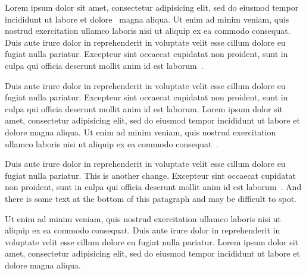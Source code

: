 Lorem ipsum dolor sit amet, consectetur adipisicing elit, sed do eiusmod tempor incididunt ut labore et dolore~\citep{Antoniades:2012qo} magna aliqua. Ut enim ad minim veniam, quis nostrud exercitation ullamco laboris nisi ut aliquip ex ea commodo consequat. Duis aute irure dolor in reprehenderit in voluptate velit esse cillum dolore eu fugiat nulla pariatur. Excepteur sint occaecat cupidatat non proident, sunt in culpa qui officia deserunt mollit anim id est laborum~\citep{International-Parkinsons-Disease-Genomics-Consortium-IPDGC:2011xr}.

Duis aute irure dolor in reprehenderit in voluptate velit esse cillum dolore eu fugiat nulla pariatur. Excepteur sint occaecat cupidatat non proident, sunt in culpa qui officia deserunt mollit anim id est laborum. Lorem ipsum dolor sit amet, consectetur adipisicing elit, sed do eiusmod tempor incididunt ut labore et dolore magna aliqua. Ut enim ad minim veniam, quis nostrud exercitation ullamco laboris nisi ut aliquip ex ea commodo consequat~\citep{Marques:2012lq}. 

Duis aute irure dolor in reprehenderit in voluptate velit esse cillum dolore eu fugiat nulla pariatur. This is another change. Excepteur sint occaecat cupidatat non proident, sunt in culpa qui officia deserunt mollit anim id est laborum~\citep{Litvan:2012os}. And there is some text at the bottom of this patagraph and may be difficult to spot.

Ut enim ad minim veniam, quis nostrud exercitation ullamco laboris nisi ut aliquip ex ea commodo consequat. Duis aute irure dolor in reprehenderit in voluptate velit esse cillum dolore eu fugiat nulla pariatur. Lorem ipsum dolor sit amet, consectetur adipisicing elit, sed do eiusmod tempor incididunt ut labore et dolore magna aliqua. 
